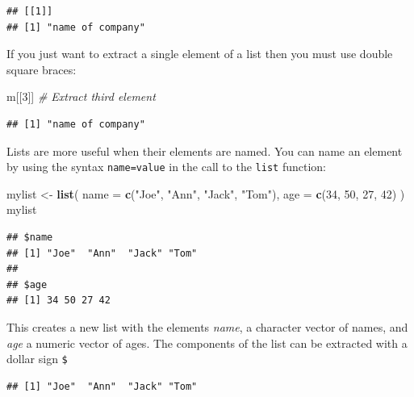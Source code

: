 \documentclass[
]{book}
\newenvironment{Shaded}{\begin{snugshade}}{\end{snugshade}}
\newcommand{\AttributeTok}[1]{\textcolor[rgb]{0.13,0.29,0.53}{#1}}
\newcommand{\CommentTok}[1]{\textcolor[rgb]{0.56,0.35,0.01}{\textit{#1}}}
\newcommand{\DecValTok}[1]{\textcolor[rgb]{0.00,0.00,0.81}{#1}}
\newcommand{\FunctionTok}[1]{\textcolor[rgb]{0.13,0.29,0.53}{\textbf{#1}}}
\newcommand{\NormalTok}[1]{#1}
\newcommand{\OtherTok}[1]{\textcolor[rgb]{0.56,0.35,0.01}{#1}}
\newcommand{\SpecialCharTok}[1]{\textcolor[rgb]{0.81,0.36,0.00}{\textbf{#1}}}
\newcommand{\StringTok}[1]{\textcolor[rgb]{0.31,0.60,0.02}{#1}}
\theoremstyle{definition}
\theoremstyle{definition}
\theoremstyle{definition}
\theoremstyle{definition}
\theoremstyle{remark}
\begin{document}
\begin{verbatim}
## [[1]]
## [1] "name of company"
\end{verbatim}

If you just want to extract a single element of a list then you must use
double square braces:

\begin{Shaded}
\begin{Highlighting}[]
\NormalTok{m[[}\DecValTok{3}\NormalTok{]] }\CommentTok{\# Extract third element}
\end{Highlighting}
\end{Shaded}

\begin{verbatim}
## [1] "name of company"
\end{verbatim}

Lists are more useful when their elements are named. You can name an element
by using the syntax \texttt{name=value} in the call to the \texttt{list} function:

\begin{Shaded}
\begin{Highlighting}[]
\NormalTok{mylist }\OtherTok{\textless{}{-}} \FunctionTok{list}\NormalTok{(}
  \AttributeTok{name =} \FunctionTok{c}\NormalTok{(}\StringTok{"Joe"}\NormalTok{, }\StringTok{"Ann"}\NormalTok{, }\StringTok{"Jack"}\NormalTok{, }\StringTok{"Tom"}\NormalTok{),}
  \AttributeTok{age =} \FunctionTok{c}\NormalTok{(}\DecValTok{34}\NormalTok{, }\DecValTok{50}\NormalTok{, }\DecValTok{27}\NormalTok{, }\DecValTok{42}\NormalTok{)}
\NormalTok{)}
\NormalTok{mylist}
\end{Highlighting}
\end{Shaded}

\begin{verbatim}
## $name
## [1] "Joe"  "Ann"  "Jack" "Tom" 
## 
## $age
## [1] 34 50 27 42
\end{verbatim}

This creates a new list with the elements \emph{name}, a character
vector of names, and \emph{age} a numeric vector of ages. The components
of the list can be extracted with a dollar sign \texttt{\$}

\begin{Shaded}
\end{Shaded}

\begin{verbatim}
## [1] "Joe"  "Ann"  "Jack" "Tom"
\end{verbatim}
\end{document}
